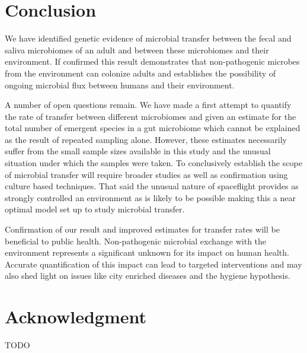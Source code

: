\section{Conclusion}

We have identified genetic evidence of microbial transfer between the fecal and saliva microbiomes of an adult and between these microbiomes and their environment. If confirmed this result demonstrates that non-pathogenic microbes from the environment can colonize adults and establishes the possibility of ongoing microbial flux between humans and their environment. 

A number of open questions remain. We have made a first attempt to quantify the rate of transfer between different microbiomes and given an estimate for the total number of emergent species in a gut microbiome which cannot be explained as the result of repeated sampling alone. However, these estimates necessarily suffer from the small sample sizes available in this study and the unusual situation under which the samples were taken. To conclusively establish the scope of microbial transfer will require broader studies as well as confirmation using culture based techniques. That said the unusual nature of spaceflight provides as strongly controlled an environment as is likely to be possible making this a near optimal model set up to study microbial transfer.

Confirmation of our result and improved estimates for transfer rates will be beneficial to public health. Non-pathogenic microbial exchange with the environment represents a significant unknown for its impact on human health. Accurate quantification of this impact can lead to targeted interventions and may also shed light on issues like city enriched diseases and the hygiene hypothesis.

\section{Acknowledgment}

TODO